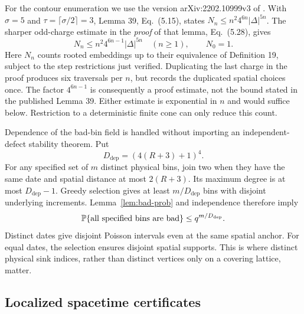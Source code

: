 For the contour enumeration we use the version
arXiv:2202.10999v3 of \cite{SST}. With \(\sigma=5\) and
\(\tau=\lceil\sigma/2\rceil=3\), Lemma 39, Eq.~(5.15), states
\(N_n\le n^2 4^{6n}|\Delta|^{5n}\). The sharper odd-charge estimate
in the \emph{proof} of that lemma, Eq.~(5.28), gives
\begin{equation}\label{eq:contour-count}
 N_n\le n^2 4^{6n-1}|\Delta|^{5n}\quad(n\ge1),\qquad N_0=1.
\end{equation}
Here \(N_n\) counts rooted embeddings up to their equivalence of
Definition 19, subject to the step restrictions just verified.
Duplicating the last charge in the proof produces six traversals
per \(n\), but records the duplicated spatial choices once.
The factor \(4^{6n-1}\) is consequently a proof estimate, not the
bound stated in the published Lemma 39. Either estimate is
exponential in \(n\) and would suffice below. Restriction to a
deterministic finite cone can only reduce this count.

Dependence of the bad-bin field is handled without importing an
independent-defect stability theorem. Put
\begin{equation}\label{eq:dependence-divisor}
 D_{\mathrm{dep}}=(4(R+3)+1)^4.
\end{equation}
For any specified set of \(m\) distinct physical bins, join two
when they have the same date and spatial distance at most
\(2(R+3)\). Its maximum degree is at most \(D_{\mathrm{dep}}-1\).
Greedy selection gives at least \(m/D_{\mathrm{dep}}\) bins with disjoint
underlying increments. Lemma~\ref{lem:bad-prob} and independence
therefore imply
\begin{equation}\label{eq:joint-sinks}
 \mathbb P\{\text{all specified bins are bad}\}\le q^{m/D_{\mathrm{dep}}}.
\end{equation}
Distinct dates give disjoint Poisson intervals even at the same
spatial anchor. For equal dates, the selection ensures disjoint
spatial supports. This is where distinct physical sink indices,
rather than distinct vertices only on a covering lattice, matter.

\subsection{Localized spacetime certificates}

